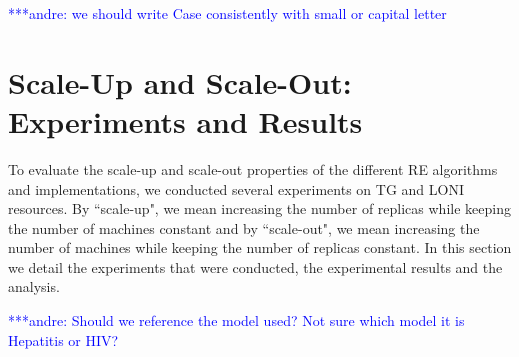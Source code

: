 \documentclass{rspublic}
\newcommand{\jhanote}[1]{ {\textcolor{red} { ***shantenu: #1 }}}
\newcommand{\alnote}[1]{ {\textcolor{blue} { ***andre: #1 }}}
\newcommand{\alnote}[1]{}
\newcommand{\jhanote}[1]{}
\begin{document}
{%


\alnote{we should write Case consistently with small or capital letter}

\section{Scale-Up and Scale-Out: Experiments and Results}
\label{sec:performance}

To evaluate the scale-up and scale-out properties of the different RE algorithms and implementations, we conducted several 
experiments on TG and LONI resources. By ``scale-up", we mean increasing the number of replicas while keeping the number of machines constant and by ``scale-out", we mean increasing the number of machines while keeping the number of replicas constant. 
In this section we detail the experiments that were conducted, the experimental results and the analysis.

\alnote{Should we reference the model used? Not sure which model it is
Hepatitis or HIV?}

}
\end{document}
